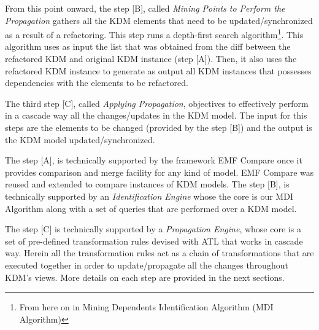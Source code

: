 From this point onward, the step [B], called \textit{Mining Points to Perform the Propagation} gathers all the KDM elements that need to be updated/synchronized as a result of a refactoring. %
This step runs a depth-first search algorithm\footnote{From here on in Mining Dependents Identification Algorithm (MDI Algorithm)}. This algorithm uses as input the list that was obtained from the diff between the refactored KDM and original KDM instance (step [A]).
Then, it also uses the refactored KDM instance to generate as output all KDM instances that possesses dependencies with the elements to be refactored. 

The third step [C], called \textit{Applying Propagation}, objectives to effectively perform in a cascade way all the changes/updates in the KDM model. The input for this steps are the elements to be changed (provided by the step [B]) and the output is the KDM model updated/synchronized. 

The step [A], is technically supported by the framework EMF Compare once it provides comparison and merge facility for any kind of model. EMF Compare was reused and extended to compare instances of KDM models. The step [B], is technically supported by an \textit{Identification Engine} whose the core is our MDI Algorithm along with a set of queries that are performed over a KDM model. %

The step [C] is technically supported by a \textit{Propagation Engine}, whose core is a set of pre-defined transformation rules devised with ATL that works in cascade way. Herein all the transformation rules act as a chain of transformations that are executed together in order to update/propagate all the changes throughout KDM's views. More details on each step are provided in the next sections.



